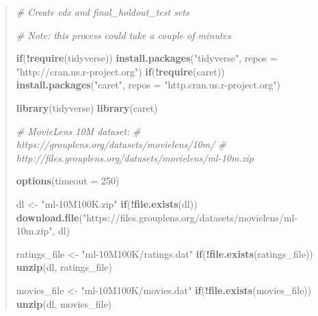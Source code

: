 \documentclass[
]{article}
\newenvironment{Shaded}{\begin{snugshade}}{\end{snugshade}}
\newcommand{\AttributeTok}[1]{\textcolor[rgb]{0.13,0.29,0.53}{#1}}
\newcommand{\CommentTok}[1]{\textcolor[rgb]{0.56,0.35,0.01}{\textit{#1}}}
\newcommand{\ControlFlowTok}[1]{\textcolor[rgb]{0.13,0.29,0.53}{\textbf{#1}}}
\newcommand{\DecValTok}[1]{\textcolor[rgb]{0.00,0.00,0.81}{#1}}
\newcommand{\FunctionTok}[1]{\textcolor[rgb]{0.13,0.29,0.53}{\textbf{#1}}}
\newcommand{\NormalTok}[1]{#1}
\newcommand{\OtherTok}[1]{\textcolor[rgb]{0.56,0.35,0.01}{#1}}
\newcommand{\SpecialCharTok}[1]{\textcolor[rgb]{0.81,0.36,0.00}{\textbf{#1}}}
\newcommand{\StringTok}[1]{\textcolor[rgb]{0.31,0.60,0.02}{#1}}
\begin{document}
\begin{quote}
\begin{Shaded}
\begin{Highlighting}[]
\CommentTok{\# Create edx and final\_holdout\_test sets}

\CommentTok{\# Note: this process could take a couple of minutes}

\ControlFlowTok{if}\NormalTok{(}\SpecialCharTok{!}\FunctionTok{require}\NormalTok{(tidyverse)) }\FunctionTok{install.packages}\NormalTok{(}\StringTok{"tidyverse"}\NormalTok{, }\AttributeTok{repos =} \StringTok{"http://cran.us.r{-}project.org"}\NormalTok{)}
\ControlFlowTok{if}\NormalTok{(}\SpecialCharTok{!}\FunctionTok{require}\NormalTok{(caret)) }\FunctionTok{install.packages}\NormalTok{(}\StringTok{"caret"}\NormalTok{, }\AttributeTok{repos =} \StringTok{"http.cran.us.r{-}project.org"}\NormalTok{)}

\FunctionTok{library}\NormalTok{(tidyverse)}
\FunctionTok{library}\NormalTok{(caret)}

\CommentTok{\# MovieLens 10M dataset:}
\CommentTok{\# https://grouplens.org/datasets/movielens/10m/}
\CommentTok{\# http://files.grouplens.org/datasets/movielens/ml{-}10m.zip}

\FunctionTok{options}\NormalTok{(}\AttributeTok{timeout =} \DecValTok{250}\NormalTok{)}

\NormalTok{dl }\OtherTok{\textless{}{-}} \StringTok{"ml{-}10M100K.zip"}
\ControlFlowTok{if}\NormalTok{(}\SpecialCharTok{!}\FunctionTok{file.exists}\NormalTok{(dl))}
  \FunctionTok{download.file}\NormalTok{(}\StringTok{"https://files.grouplens.org/datasets/movielens/ml{-}10m.zip"}\NormalTok{, dl)}

\NormalTok{ratings\_file }\OtherTok{\textless{}{-}} \StringTok{"ml{-}10M100K/ratings.dat"}
\ControlFlowTok{if}\NormalTok{(}\SpecialCharTok{!}\FunctionTok{file.exists}\NormalTok{(ratings\_file))}
  \FunctionTok{unzip}\NormalTok{(dl, ratings\_file)}

\NormalTok{movies\_file }\OtherTok{\textless{}{-}} \StringTok{"ml{-}10M100K/movies.dat"}
\ControlFlowTok{if}\NormalTok{(}\SpecialCharTok{!}\FunctionTok{file.exists}\NormalTok{(movies\_file))}
  \FunctionTok{unzip}\NormalTok{(dl, movies\_file)}


\end{Highlighting}
\end{Shaded}
\end{quote}
\end{document}
